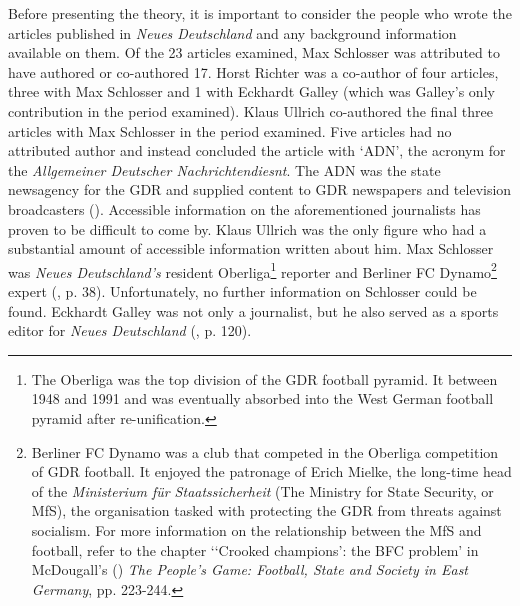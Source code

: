 Before presenting the theory, it is important to consider the people who wrote the articles published in \textit{Neues Deutschland} and any background information available on them. Of the 23 articles examined, Max Schlosser was attributed to have authored or co-authored 17. Horst Richter was a co-author of four articles, three with Max Schlosser and 1 with Eckhardt Galley (which was Galley’s only contribution in the period examined). Klaus Ullrich co-authored the final three articles with Max Schlosser in the period examined. Five articles had no attributed author and instead concluded the article with ‘ADN’, the acronym for the \textit{Allgemeiner Deutscher Nachrichtendiesnt}. The ADN was the state newsagency for the GDR and supplied content to GDR newspapers and television broadcasters (\cite{wilke1998}). Accessible information on the aforementioned journalists has proven to be difficult to come by. Klaus Ullrich was the only figure who had a substantial amount of accessible information written about him. Max Schlosser was \textit{Neues Deutschland’s} resident Oberliga\footnote{The Oberliga was the top division of the GDR football pyramid. It between 1948 and 1991 and was eventually absorbed into the West German football pyramid after re-unification.} reporter and Berliner FC Dynamo\footnote{Berliner FC Dynamo was a club that competed in the Oberliga competition of GDR football. It enjoyed the patronage of Erich Mielke, the long-time head of the \textit{Ministerium für Staatssicherheit} (The Ministry for State Security, or MfS), the organisation tasked with protecting the GDR from threats against socialism. For more information on the relationship between the MfS and football, refer to the chapter ‘‘Crooked champions’: the BFC problem’ in McDougall’s (\citeyear{mcdougall2014}) \textit{The People’s Game: Football, State and Society in East Germany}, pp. 223-244.} expert (\cite{kannowski1999}, p. 38). Unfortunately, no further information on Schlosser could be found. Eckhardt Galley was not only a journalist, but he also served as a sports editor for \textit{Neues Deutschland} (\cite{landes2011}, p. 120).

